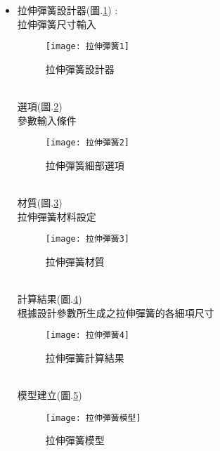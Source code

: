 \begin{itemize}
	\item 拉伸彈簧設計器(圖.\ref{2.56}) :\\
		\qquad 拉伸彈簧尺寸輸入\\
		\begin{figure}[hbt!]
		\begin{center}
		\texttt{[image: 拉伸彈簧1]}
		\caption{\Large 拉伸彈簧設計器}\label{2.56}
		\end{center}
		\end{figure}
		\\
		選項(圖.\ref{2.57})\\
		\qquad 參數輸入條件\\
		\begin{figure}[hbt!]
		\begin{center}
		\texttt{[image: 拉伸彈簧2]}
		\caption{\Large 拉伸彈簧細部選項}\label{2.57}
		\end{center}
		\end{figure}
		\\
		材質(圖.\ref{2.58})\\
		\qquad 拉伸彈簧材料設定\\
		\begin{figure}[hbt!]
		\begin{center}
		\texttt{[image: 拉伸彈簧3]}
		\caption{\Large 拉伸彈簧材質}\label{2.58}
		\end{center}
		\end{figure}
		\\
		計算結果(圖.\ref{2.59})\\
		\qquad 根據設計參數所生成之拉伸彈簧的各細項尺寸\\
		\begin{figure}[hbt!]
		\begin{center}
		\texttt{[image: 拉伸彈簧4]}
		\caption{\Large 拉伸彈簧計算結果}\label{2.59}
		\end{center}
		\end{figure}
		\\
		模型建立(圖.\ref{2.60})\\
		\begin{figure}[hbt!]
		\begin{center}
		\texttt{[image: 拉伸彈簧模型]}
		\caption{\Large 拉伸彈簧模型}\label{2.60}
		\end{center}
		\end{figure}
		\\
		
\newpage
		

\end{itemize}
